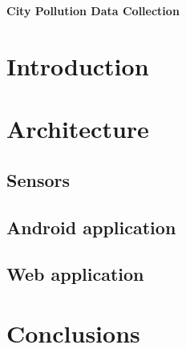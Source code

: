 \documentclass[12pt]{article}
\begin{document}
  \begin{center}
    \LARGE{\textbf{City Pollution Data Collection}}
  \end{center}
  \section{Introduction}
  \section{Architecture}
  \subsection{Sensors}
  \subsection{Android application}
  \subsection{Web application}
  \section{Conclusions}
  
\end{document}

